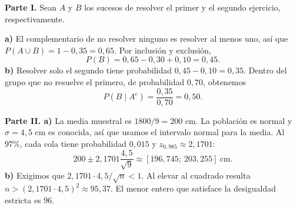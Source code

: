 \textbf{Parte I.} Sean $A$ y $B$ los sucesos de resolver el primer y el segundo ejercicio, respectivamente.

\textbf{a)} El complementario de no resolver ninguno es resolver al menos uno, así que $P(A\cup B)=1-0{,}35=0{,}65$. Por inclusión y exclusión,
\[
 P(B)=0{,}65-0{,}30+0{,}10=\boxed{0{,}45}.
\]
\textbf{b)} Resolver solo el segundo tiene probabilidad $0{,}45-0{,}10=0{,}35$. Dentro del grupo que no resuelve el primero, de probabilidad $0{,}70$, obtenemos
\[
 P(B\mid A^c)=\frac{0{,}35}{0{,}70}=\boxed{0{,}50}.
\]

\textbf{Parte II. a)} La media muestral es $1800/9=200$ cm. La población es normal y $\sigma=4{,}5$ cm es conocida, así que usamos el intervalo normal para la media. Al $97\%$, cada cola tiene probabilidad $0{,}015$ y $z_{0{,}985}\approx2{,}1701$:
\[
 200\pm 2{,}1701\frac{4{,}5}{\sqrt9}
 \approx\boxed{[196{,}745;\ 203{,}255]}\ \text{cm}.
\]
\textbf{b)} Exigimos que $2{,}1701\cdot4{,}5/\sqrt n<1$. Al elevar al cuadrado resulta $n>(2{,}1701\cdot4{,}5)^2\approx95{,}37$. El menor entero que satisface la desigualdad estricta es $\boxed{96}$.
